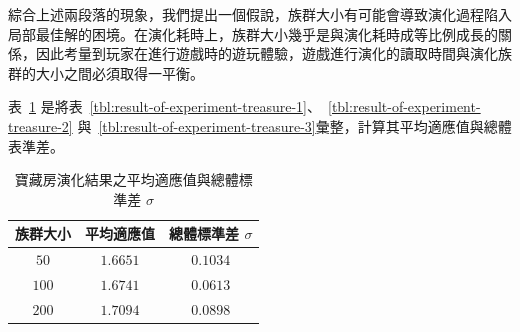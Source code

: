 綜合上述兩段落的現象，我們提出一個假說，族群大小有可能會導致演化過程陷入局部最佳解的困境。在演化耗時上，族群大小幾乎是與演化耗時成等比例成長的關係，因此考量到玩家在進行遊戲時的遊玩體驗，遊戲進行演化的讀取時間與演化族群的大小之間必須取得一平衡。

表~\ref{tbl:result-of-experiment-treasure-avg-sd} 是將表~\ref{tbl:result-of-experiment-treasure-1}、~\ref{tbl:result-of-experiment-treasure-2} 與~\ref{tbl:result-of-experiment-treasure-3}彙整，計算其平均適應值與總體表準差。

\begin{table}[H]
  \centering
  \caption{寶藏房演化結果之平均適應值與總體標準差 $\sigma$}
  \label{tbl:result-of-experiment-treasure-avg-sd}
  \bigskip
  \vspace{-5mm}
  \begin{tabular}[t]{ | c | c | c | }
    \hline
    族群大小 & 平均適應值 & 總體標準差 $\sigma$ \\\hline
    $50$  & $1.6651$ & $0.1034$ \\\hline
    $100$ & $1.6741$ & $0.0613$ \\\hline
    $200$ & $1.7094$ & $0.0898$ \\\hline
  \end{tabular}
\end{table}


